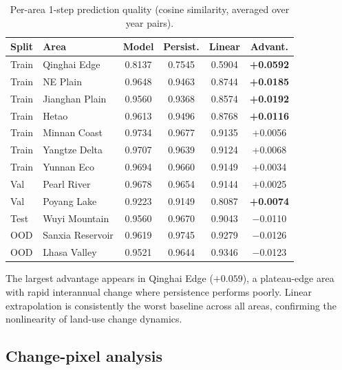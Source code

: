 \documentclass{article}
\begin{document}
\begin{table}[htbp]
\centering
\caption{Per-area 1-step prediction quality (cosine similarity, averaged over year pairs).}
\label{tab:perarea}
\begin{tabular}{llcccc}
\toprule
Split & Area & Model & Persist. & Linear & Advant. \\
\midrule
Train & Qinghai Edge & 0.8137 & 0.7545 & 0.5904 & \textbf{+0.0592} \\
Train & NE Plain & 0.9648 & 0.9463 & 0.8744 & \textbf{+0.0185} \\
Train & Jianghan Plain & 0.9560 & 0.9368 & 0.8574 & \textbf{+0.0192} \\
Train & Hetao & 0.9613 & 0.9496 & 0.8768 & \textbf{+0.0116} \\
Train & Minnan Coast & 0.9734 & 0.9677 & 0.9135 & +0.0056 \\
Train & Yangtze Delta & 0.9707 & 0.9639 & 0.9124 & +0.0068 \\
Train & Yunnan Eco & 0.9694 & 0.9660 & 0.9149 & +0.0034 \\
Val & Pearl River & 0.9678 & 0.9654 & 0.9144 & +0.0025 \\
Val & Poyang Lake & 0.9223 & 0.9149 & 0.8087 & \textbf{+0.0074} \\
Test & Wuyi Mountain & 0.9560 & 0.9670 & 0.9043 & $-$0.0110 \\
OOD & Sanxia Reservoir & 0.9619 & 0.9745 & 0.9279 & $-$0.0126 \\
OOD & Lhasa Valley & 0.9521 & 0.9644 & 0.9346 & $-$0.0123 \\
\bottomrule
\end{tabular}
\end{table}

The largest advantage appears in Qinghai Edge ($+0.059$), a plateau-edge area with rapid interannual change where persistence performs poorly. Linear extrapolation is consistently the worst baseline across all areas, confirming the nonlinearity of land-use change dynamics.

\subsection{Change-pixel analysis}
\end{document}
